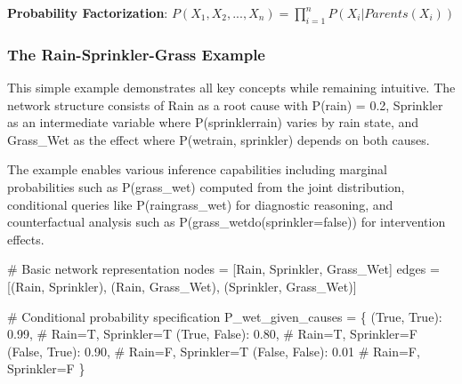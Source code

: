 \documentclass[
  11pt,
  letterpaper,
]{book}
\newenvironment{Shaded}{\begin{snugshade}}{\end{snugshade}}
\newcommand{\CommentTok}[1]{\textcolor[rgb]{0.37,0.37,0.37}{#1}}
\newcommand{\FloatTok}[1]{\textcolor[rgb]{0.68,0.00,0.00}{#1}}
\newcommand{\NormalTok}[1]{\textcolor[rgb]{0.00,0.23,0.31}{#1}}
\newcommand{\OperatorTok}[1]{\textcolor[rgb]{0.37,0.37,0.37}{#1}}
\newcommand{\StringTok}[1]{\textcolor[rgb]{0.13,0.47,0.30}{#1}}
\newcommand{\VariableTok}[1]{\textcolor[rgb]{0.07,0.07,0.07}{#1}}
\begin{document}
\textbf{Probability Factorization}:
\(P(X_1, X_2, ..., X_n) = \prod_{i=1}^{n} P(X_i | Parents(X_i))\)

\subsubsection{The Rain-Sprinkler-Grass
Example}\label{sec-rain-sprinkler-example}

This simple example demonstrates all key concepts while remaining
intuitive. The network structure consists of Rain as a root cause with
P(rain) = 0.2, Sprinkler as an intermediate variable where
P(sprinkler\textbar rain) varies by rain state, and Grass\_Wet as the
effect where P(wet\textbar rain, sprinkler) depends on both causes.

The example enables various inference capabilities including marginal
probabilities such as P(grass\_wet) computed from the joint
distribution, conditional queries like P(rain\textbar grass\_wet) for
diagnostic reasoning, and counterfactual analysis such as
P(grass\_wet\textbar do(sprinkler=false)) for intervention effects.

\begin{Shaded}
\begin{Highlighting}[]
\CommentTok{\# Basic network representation}
\NormalTok{nodes }\OperatorTok{=}\NormalTok{ [}\StringTok{\textquotesingle{}Rain\textquotesingle{}}\NormalTok{, }\StringTok{\textquotesingle{}Sprinkler\textquotesingle{}}\NormalTok{, }\StringTok{\textquotesingle{}Grass\_Wet\textquotesingle{}}\NormalTok{]}
\NormalTok{edges }\OperatorTok{=}\NormalTok{ [(}\StringTok{\textquotesingle{}Rain\textquotesingle{}}\NormalTok{, }\StringTok{\textquotesingle{}Sprinkler\textquotesingle{}}\NormalTok{), (}\StringTok{\textquotesingle{}Rain\textquotesingle{}}\NormalTok{, }\StringTok{\textquotesingle{}Grass\_Wet\textquotesingle{}}\NormalTok{), (}\StringTok{\textquotesingle{}Sprinkler\textquotesingle{}}\NormalTok{, }\StringTok{\textquotesingle{}Grass\_Wet\textquotesingle{}}\NormalTok{)]}

\CommentTok{\# Conditional probability specification}
\NormalTok{P\_wet\_given\_causes }\OperatorTok{=}\NormalTok{ \{}
\NormalTok{    (}\VariableTok{True}\NormalTok{, }\VariableTok{True}\NormalTok{): }\FloatTok{0.99}\NormalTok{,    }\CommentTok{\# Rain=T, Sprinkler=T}
\NormalTok{    (}\VariableTok{True}\NormalTok{, }\VariableTok{False}\NormalTok{): }\FloatTok{0.80}\NormalTok{,   }\CommentTok{\# Rain=T, Sprinkler=F  }
\NormalTok{    (}\VariableTok{False}\NormalTok{, }\VariableTok{True}\NormalTok{): }\FloatTok{0.90}\NormalTok{,   }\CommentTok{\# Rain=F, Sprinkler=T}
\NormalTok{    (}\VariableTok{False}\NormalTok{, }\VariableTok{False}\NormalTok{): }\FloatTok{0.01}   \CommentTok{\# Rain=F, Sprinkler=F}
\NormalTok{\}}
\end{Highlighting}
\end{Shaded}
\end{document}
